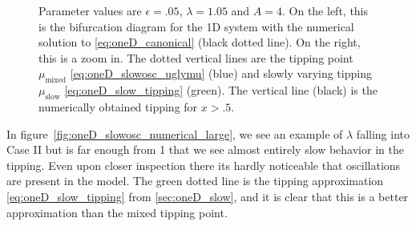 \begin{figure}[H]
\begin{subfigure}{.5\textwidth}
  \caption{}
\end{subfigure}
\caption{Parameter values are $\epsilon=.05$, $\lambda=1.05$ and $A=4$. On the left, this is the bifurcation diagram for the 1D system with the numerical solution to \eqref{eq:oneD_canonical} (black dotted line). On the right, this is a zoom in. The dotted vertical lines are the tipping point $\mu_{\text{mixed}}$ \eqref{eq:oneD_slowosc_uglymu} (blue) and slowly varying tipping $\mu_{\text{slow}}$ \eqref{eq:oneD_slow_tipping} (green). The vertical line (black) is the numerically obtained tipping for $x>.5$.}
\label{fig:oneD_slowosc_numerical_medium}
\end{figure}

In figure~\ref{fig:oneD_slowosc_numerical_large}, we see an example of $\lambda$ falling into Case II but is far enough from 1 that we see almost entirely slow behavior in the tipping. Even upon closer inspection there its hardly noticeable that oscillations are present in the model. The green dotted line is the tipping approximation \eqref{eq:oneD_slow_tipping} from \autoref{sec:oneD_slow}, and it is clear that this is a better approximation than the mixed tipping point.

